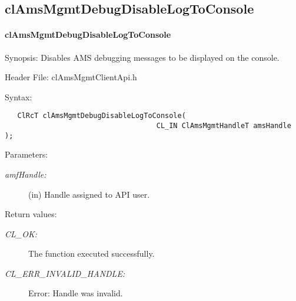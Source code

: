  \subsection{clAmsMgmtDebugDisableLogToConsole}
 \hypertarget{pageams129}{}\paragraph{cl\-Ams\-Mgmt\-Debug\-Disable\-Log\-To\-Console}\label{pageams129}
 \begin{Desc}
\item[Synopsis:] Disables AMS debugging messages to be displayed on the console.
\end{Desc}
\begin{Desc}
\item[Header File:]clAmsMgmtClientApi.h\end{Desc}
\begin{Desc}
\item[Syntax:]

\footnotesize\begin{verbatim}   ClRcT clAmsMgmtDebugDisableLogToConsole(
                                	CL_IN ClAmsMgmtHandleT amsHandle );

\end{verbatim}
\normalsize
\end{Desc}
\begin{Desc}
\item[Parameters:]
\begin{description}
\item[{\em amf\-Handle:}](in) Handle assigned to API user.
\end{description}
\end{Desc}
\begin{Desc}
\item[Return values:]
\begin{description}
\item[{\em CL\_\-OK:}]The function executed successfully.
\item[{\em CL\_\-ERR\_\-INVALID\_\-HANDLE:}] Error: Handle was invalid.
\end{description}
\end{Desc}
